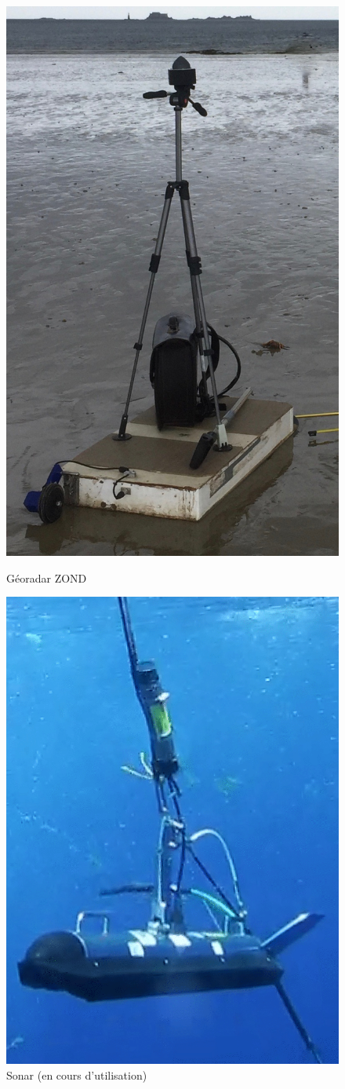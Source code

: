 \documentclass[12pt,a4paper]{report}
\begin{document}
	\begin{figure}
		\centering
		
		\begin{minipage}{.5\textwidth}
			\centering
			\includegraphics[width=0.7\linewidth]{img/IMG_0332}
			\caption[Géoradar]{Géoradar ZOND}
			\label{fig:georadar}
		\end{minipage}%
		\begin{minipage}{.5\textwidth}
				\centering
			\includegraphics[width=0.7\linewidth]{img/sonar}
			\caption[sonar]{Sonar (en cours d'utilisation)}
			\label{fig:sonar}
		\end{minipage}
	\end{figure}
	
\end{document}

